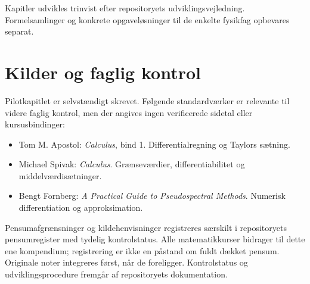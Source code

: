 \documentclass[11pt,a4paper,oneside]{book}
\begin{document}
Kapitler udvikles trinvist efter repositoryets udviklingsvejledning. Formelsamlinger og konkrete opgaveløsninger til de enkelte fysikfag opbevares separat.
\begingroup\small
\tableofcontents
\endgroup
\mainmatter





















\backmatter
\chapter{Kilder og faglig kontrol}
Pilotkapitlet er selvstændigt skrevet. Følgende standardværker er relevante til videre faglig kontrol, men der angives ingen verificerede sidetal eller kursusbindinger:
\begin{itemize}
\item Tom M. Apostol: \emph{Calculus}, bind 1. Differentialregning og Taylors sætning.
\item Michael Spivak: \emph{Calculus}. Grænseværdier, differentiabilitet og middelværdisætninger.
\item Bengt Fornberg: \emph{A Practical Guide to Pseudospectral Methods}. Numerisk differentiation og approksimation.
\end{itemize}
Pensumafgrænsninger og kildehenvisninger registreres særskilt i repositoryets pensumregister med tydelig kontrolstatus. Alle matematikkurser bidrager til dette ene kompendium; registrering er ikke en påstand om fuldt dækket pensum. Originale noter integreres først, når de foreligger. Kontrolstatus og udviklingsprocedure fremgår af repositoryets dokumentation.
\end{document}
